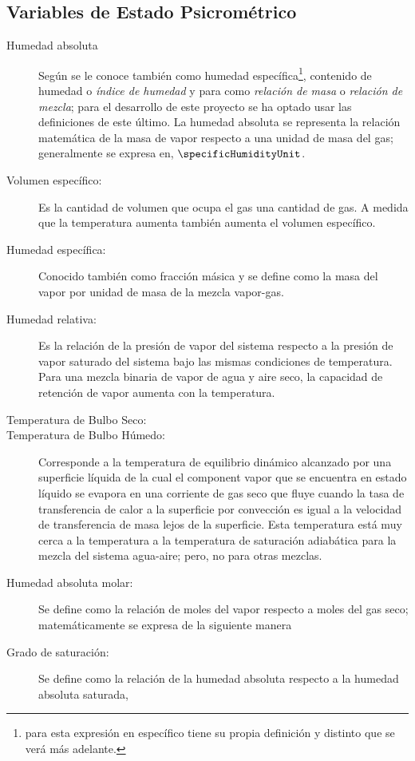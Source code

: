 \subsection{Variables de Estado Psicrométrico}
    \begin{description}
        \item[Humedad absoluta] Según \parencite[p. 729]{bib:cengel2015termodinamica} se le conoce también como humedad específica\footnote{para \parencite{bib:green2007perry} esta expresión en específico tiene su propia definición y distinto que se verá más adelante.}, contenido de humedad o \textit{índice de humedad} y para \parencite[p. 12-4]{bib:green2007perry} como \textit{relación de masa} o \textit{relación de mezcla}; para el desarrollo de este proyecto se ha optado usar las definiciones de este último. La humedad absoluta se representa la relación matemática de la masa de vapor respecto a una unidad de masa del gas; generalmente se expresa en, $\specificHumidityUnit$.
        \eqAbsoluteHumidity*
        \item[Volumen específico:] Es la cantidad de volumen que ocupa el gas una cantidad de gas. A medida que la temperatura aumenta también aumenta el volumen específico.
        \item[Humedad específica:] Conocido también como fracción másica y se define como la masa del vapor por unidad de masa de la mezcla vapor-gas.
        \item[Humedad relativa:] Es la relación de la presión de vapor del sistema respecto a la presión de vapor saturado del sistema bajo las mismas condiciones de temperatura. Para una mezcla binaria de vapor de agua y aire seco, la capacidad de retención de vapor aumenta con la temperatura.
        \item[Temperatura de Bulbo Seco:]  
        \item[Temperatura de Bulbo Húmedo:] Corresponde a la temperatura de equilibrio dinámico alcanzado por una superficie líquida de la cual el component vapor que se encuentra en estado líquido se evapora en una corriente de gas seco que fluye cuando la tasa de transferencia de calor a la superficie por convección es igual a la velocidad de transferencia de masa lejos de la superficie. Esta temperatura está muy cerca a la temperatura a la temperatura de saturación adiabática para la mezcla del sistema agua-aire; pero, no para otras mezclas.
        \item[Humedad absoluta molar:] Se define como la relación de moles del vapor respecto a moles del gas seco; matemáticamente se expresa de la siguiente manera
        \item[Grado de saturación:] Se define como la relación de la humedad absoluta respecto a la humedad absoluta saturada,
        

\end{description}
